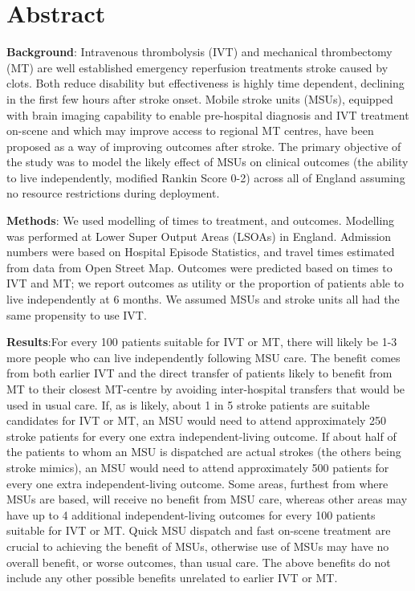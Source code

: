 \section*{Abstract}

\textbf{Background}: Intravenous thrombolysis (IVT) and mechanical thrombectomy (MT) are well established emergency reperfusion treatments stroke caused by clots. Both reduce disability but effectiveness is  highly time dependent, declining in the first few hours after stroke onset. Mobile stroke units (MSUs), equipped with brain imaging capability to enable pre-hospital diagnosis and IVT treatment on-scene and which may improve access to regional MT centres, have been proposed as a way of improving outcomes after stroke. The primary objective of the study was to model the likely effect of MSUs on clinical outcomes (the ability to live independently, modified Rankin Score 0-2) across all of England assuming no resource restrictions during deployment. 

\textbf{Methods}: We used modelling of times to treatment, and outcomes. Modelling was performed at Lower Super Output Areas (LSOAs) in England. Admission numbers were based on Hospital Episode Statistics, and travel times estimated from data from Open Street Map. Outcomes were predicted based on times to IVT and MT; we report outcomes as utility or the proportion of patients able to live independently at 6 months. We assumed MSUs and stroke units all had the same propensity to use IVT.

\textbf{Results}:For every 100 patients suitable for IVT or MT, there will likely be 1-3 more people who can live independently following MSU care. The benefit comes from both earlier IVT and the direct transfer of patients likely to benefit from MT to their closest MT-centre by avoiding inter-hospital transfers that would be used in usual care. If, as is likely, about 1 in 5 stroke patients are suitable candidates for IVT or MT, an MSU would need to attend approximately 250 stroke patients for every one extra independent-living outcome. If about half of the patients to whom an MSU is dispatched are actual strokes (the others being stroke mimics), an MSU would need to attend approximately 500 patients for every one extra independent-living outcome. Some areas, furthest from where MSUs are based, will receive no benefit from MSU care, whereas other areas may have up to 4 additional independent-living outcomes for every 100 patients suitable for IVT or MT. Quick MSU dispatch and fast on-scene treatment are crucial to achieving the benefit of MSUs, otherwise use of MSUs may have no overall benefit, or worse outcomes, than usual care. The above benefits do not include any other possible benefits unrelated to earlier IVT or MT.

